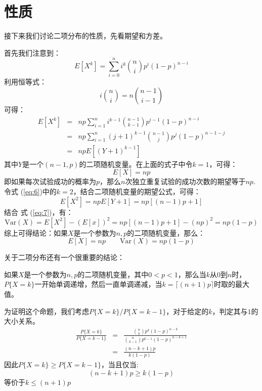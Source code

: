 \documentclass[10pt,a4paper,UTF8]{article}
\begin{document}
\section{性质}
\label{sec:orgd760a5a}


接下来我们讨论二项分布的性质，先看期望和方差。

首先我们注意到：
\begin{equation}
\label{eq:4}
E[X^{k}] = \sum_{i=0}^{n}i^{k}\binom{n}{i}p^{i}(1-p)^{n-i}
\end{equation}
利用恒等式：
\begin{equation}
\label{eq:5}
i\binom{n}{i} = n\binom{n-1}{i-1}
\end{equation}
可得：
\begin{eqnarray}
\label{eq:6}
E[X^{k}]&=& np \sum_{i=1}^{n} i^{k-1}\binom{n-1}{k-1}p^{i-1}(1-p)^{n-i}  \\
&=& np \sum_{i=1}^{n} (j+1)^{k-1} \binom{n-1}{j}p^{j}(1-p)^{n-1-j} \\
&=& npE[(Y+1)^{k-1}]
\end{eqnarray}
其中\(Y\)是一个\((n-1,p)\)的二项随机变量。在上面的式子中令\(k=1\)，可得：
\begin{equation}
\label{eq:7}
E[X] = np
\end{equation}
即如果每次试验成功的概率为\(p\)，那么\(n\)次独立重复试验的成功次数的期望等于\(np\). 令式 (\ref{eq:6})中的\(k=2\)，结合二项随机变量的期望公式，可得：
\begin{equation}
\label{eq:8}
E[X^{2}] = np E[Y+1] = np [(n-1)p +1]
\end{equation}
结合 式 (\ref{eq:7})，有：
\begin{equation}
\label{eq:9}
\mathrm{Var}(X) = E[X^{2}] - (E[x])^{2} = np[(n-1)p + 1] - (np)^{2} = np(1-p)
\end{equation}
综上可得结论：如果\(X\)是一个参数为\(n,p\)的二项随机变量，那么：
\begin{equation}
\label{eq:10}
E[X] = np \qquad \mathrm{Var}(X) = np(1-p)
\end{equation}

关于二项分布还有一个很重要的结论：

\begin{tikztheorem}
如果\(X\)是一个参数为\(n,p\)的二项随机变量，其中\(0 < p < 1\)，那么当\(k\)从\(0\)到\(n\)时，\(P\{X=k\}\)一开始单调递增，然后一直单调递减，当\(k = \lceil (n+1)p \rceil\)时取的最大值。
\end{tikztheorem}
\begin{tikzproof}
为证明这个命题，我们考虑\(P\{X=k\}/P\{X=k-1\}\)，对于给定的\(k\)，判定其与\(1\)的大小关系。
\begin{eqnarray}
\label{eq:11}
\frac{P\{X=k\}}{P\{X=k-1\}}&=&\frac{ \binom{n}{k}p^{k}(1-p)^{n-k} }{\binom{n}{k-1}p^{k-1}(1-p)^{n-k+1}} \\
&=& \frac{(n-k+1)p}{k(1-p)}
\end{eqnarray}
因此\(P\{X=k\} \geq P\{X=k-1\}\)，当且仅当:
\begin{equation}
\label{eq:12}
(n-k+1)p \geq k(1-p)
\end{equation}
等价于\(k\leq (n+1)p\)
\end{tikzproof}
\end{document}
